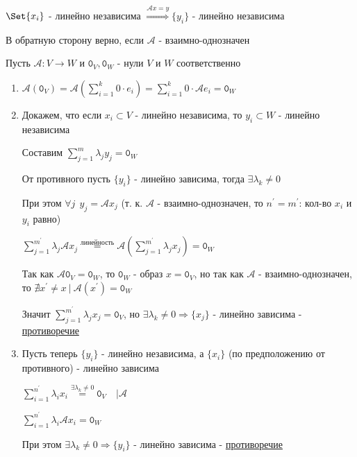 \documentclass[12pt]{article}
\begin{document}
    \begin{MyTheorem}
        \Ths $\Set{x_i}$ - линейно независима $\stackrel{\mathcal{A}x = y}{\Longrightarrow} \{y_i\}$ - линейно независима

        В обратную сторону верно, если $\mathcal{A}$ - взаимно-однозначен
    \end{MyTheorem}

    \begin{MyProof}
        Пусть $\mathcal{A} : V \rightarrow W$ и $\texttt{0}_V, \texttt{0}_W$ - нули $V$ и $W$ соответственно

        \begin{enumerate}
            \item $\mathcal{A}(\texttt{0}_V) = \mathcal{A}\left(\sum^k_{i=1} 0 \cdot e_i\right) = \sum^k_{i=1} 0 \cdot \mathcal{A}e_i = \texttt{0}_W$

            \item Докажем, что если ${x_i} \subset V$ - линейно независима, то ${y_i} \subset W$ - линейно независима

            Составим $\sum^m_{j=1} \lambda_j y_j = \texttt{0}_W$ 
            
            От противного пусть $\{y_i\}$ - линейно зависима, тогда $\exists \lambda_k \neq 0$

            При этом $\forall j \ \ y_j = \mathcal{A}x_j$ (т. к. $\mathcal{A}$ - взаимно-однозначен, 
            то $n^\prime = m^\prime$: кол-во $x_i$ и $y_i$ равно)

            $\sum^{m^\prime}_{j=1} \lambda_j \mathcal{A}x_j \stackrel{\text{линейность}}{=} \mathcal{A} (\sum^{m^\prime}_{j=1} \lambda_j x_j) = \texttt{0}_W$

            Так как $\mathcal{A}\texttt{0}_V = \texttt{0}_W$, то $\texttt{0}_W$ - образ $x = \texttt{0}_V$, 
            но так как $\mathcal{A}$ - взаимно-однозначен, то
            $\nexists x^\prime \neq x \ | \ \mathcal{A}(x^\prime) = \texttt{0}_W$

            Значит $\sum^{m^\prime}_{j=1} \lambda_j x_j = \texttt{0}_V$, но 
            $\exists \lambda_k \neq 0 \Longrightarrow \{x_j\}$ - линейно зависима - \underline{противоречие}

            \item Пусть теперь $\{y_i\}$ - линейно независима, а $\{x_i\}$ (по предположению от противного) - линейно зависима

            $\sum^{n^\prime}_{i = 1} \lambda_i x_i \stackrel{\exists \lambda_k \neq 0}{=} \texttt{0}_V \quad \Big| \mathcal{A}$

            $\sum^{n^\prime}_{i = 1} \lambda_i \mathcal{A}x_i = \texttt{0}_W$

            При этом $\exists \lambda_k \neq 0 \Longrightarrow \{y_i\}$ - линейно зависима - \underline{противоречие}

        \end{enumerate}
    \end{MyProof}
\end{document}

